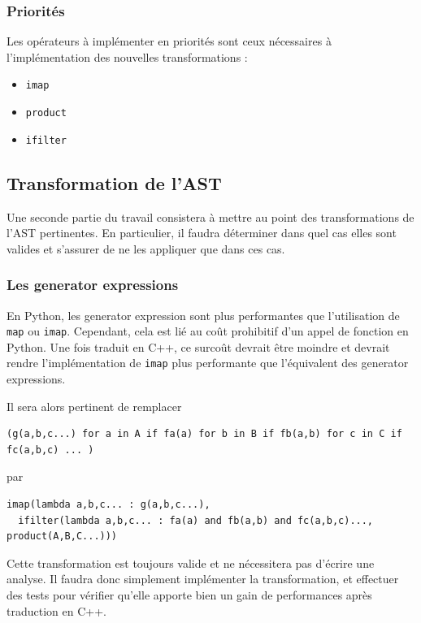 \documentclass[a4paper]{article}
\begin{document}
\subsubsection{Priorités}

Les opérateurs à implémenter en priorités sont ceux nécessaires à
l'implémentation des nouvelles transformations :

\begin{itemize}
  \item \texttt{imap}
  \item \texttt{product}
  \item \texttt{ifilter}
\end{itemize}


\subsection{Transformation de l'AST}

Une seconde partie du travail consistera à mettre au point des
transformations de l'AST pertinentes. En particulier, il faudra
déterminer dans quel cas elles sont valides et s'assurer de ne les
appliquer que dans ces cas.

\subsubsection{Les generator expressions}

En Python, les generator expression sont plus performantes que
l'utilisation de \texttt{map} ou \texttt{imap}. Cependant, cela est lié au coût
prohibitif d'un appel de fonction en Python. Une fois traduit en C++,
ce surcoût devrait être moindre et devrait rendre l'implémentation de
\texttt{imap} plus performante que l'équivalent des generator expressions.

Il sera alors pertinent de remplacer

\begin{lstlisting}
(g(a,b,c...) for a in A if fa(a) for b in B if fb(a,b) for c in C if fc(a,b,c) ... )
\end{lstlisting}
 
par

\begin{lstlisting}
imap(lambda a,b,c... : g(a,b,c...), 
  ifilter(lambda a,b,c... : fa(a) and fb(a,b) and fc(a,b,c)..., product(A,B,C...)))
\end{lstlisting}

Cette transformation est toujours valide et ne nécessitera pas
d'écrire une analyse. Il faudra donc simplement implémenter la
transformation, et effectuer des tests pour vérifier qu'elle apporte
bien un gain de performances après traduction en C++.
\end{document}
